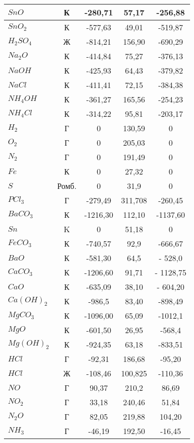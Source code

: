 \begin{longtable}[h]{|p{3cm}|c|c|c|c|}
 \hline $SnO$ & К & -280,71 & 57,17 & -256,88\\ 
 \hline $SnO_{2}$ & К & -577,63 & 49,01 & -519,87\\ 
 \hline $H_{2}SO_{4}$ & Ж & -814,21 & 156,90 & -690,29\\ 
 \hline $Na_{2}O$ & К & -414,84 & 75,27 & -376,13\\ 
 \hline $NaOH$ & К & -425,93 & 64,43 & -379,82\\ 
 \hline $NaCl$ & К & -411,41 & 72,15 & -384,38\\ 
 \hline $NH_{4}OH$ & К & -361,27 & 165,56 & -254,23\\ 
 \hline $NH_{4}Cl$ & К & -314,22 & 95,81 & -203,17\\ 
 \hline $H_{2}$ & Г & 0 & 130,59 & 0\\ 
 \hline $O_{2}$ & Г & 0 & 205,03 & 0\\ 
 \hline $N_{2}$ & Г & 0 & 191,49 & 0\\ 
 \hline $Fe$ & К & 0 & 27,32 & 0\\ 
 \hline $S$ & Ромб. & 0 & 31,9 & 0\\ 
 \hline $PCl_{3}$ & Г & -279,49 & 311,708 & -260,45\\ 
 \hline $BaCO_{3}$ & К & -1216,30 & 112,10 & -1137,60\\ 
 \hline $Sn$ & K & 0 & 51,18 & 0\\ 
 \hline $FeCO_{3}$ & К & -740,57 & 92,9 & -666,67\\ 
 \hline $BaO$ & К & -581,30 & 64,5 & - 528,0\\ 
 \hline $CaCO_{3}$ & К & -1206,60 & 91,71 & - 1128,75\\ 
 \hline $CaO$ & К & -635,09 & 38,10 & - 604,20\\ 
 \hline $Ca(OH)_{2}$ & К & -986,5 & 83,40 & -898,49\\ 
 \hline $MgCO_{3}$ & К & -1096,00 & 65,09 & -1012,1\\ 
 \hline $MgO$ & К & -601,50 & 26,95 & -568,4\\ 
 \hline $Mg(OH)_{2}$ & К & -924,35 & 63,18 & -833,51\\ 
 \hline $HCl$ & Г & -92,31 & 186,68 & -95,20\\ 
 \hline $HCl$ & Ж & -108,46 & 100,825 & -110,36\\ 
 \hline $NO$ & Г & 90,37 & 210,2 & 86,69\\ 
 \hline $NO_{2}$ & Г & 33,18 & 240,46 & 51,84\\ 
 \hline $N_{2}O$ & Г & 82,05 & 219,88 & 104,20\\ 
 \hline $NH_{3}$ & Г & -46,19 & 192,50 & -16,45\\ 

\end{longtable}
